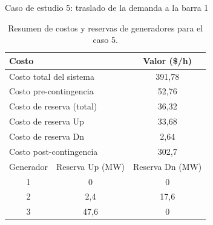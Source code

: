 \begin{frame}{Caso de estudio 5: traslado de la demanda a la barra 1}
\small
\begin{table}[H]
    \renewcommand{\arraystretch}{1.3}
    \centering
    \caption{Resumen de costos y reservas de generadores para el caso 5.}
    \label{tab:res_ctos_caso5}
    \begin{tabular}{|c|c|c|}
		\hline
		\multicolumn{2}{|l|}{Costo} & Valor (\$/h) \\
		\hline
		\multicolumn{2}{|l|}{Costo total del sistema} & 391,78 \\
		\multicolumn{2}{|l|}{Costo pre-contingencia} & 52,76 \\
		\multicolumn{2}{|l|}{Costo de reserva (total)} & 36,32 \\
		\multicolumn{2}{|l|}{Costo de reserva Up} & 33,68 \\
		\multicolumn{2}{|l|}{Costo de reserva Dn} & 2,64 \\
		\multicolumn{2}{|l|}{Costo post-contingencia} & 302,7 \\
		\hline \hline
		Generador & Reserva Up (MW) & Reserva Dn (MW) \\
		\hline
		1 & 0 & 0 \\
		2 & 2,4 & 17,6 \\
		3 & 47,6 & 0 \\
		\hline
	\end{tabular}
\end{table}
\end{frame}
